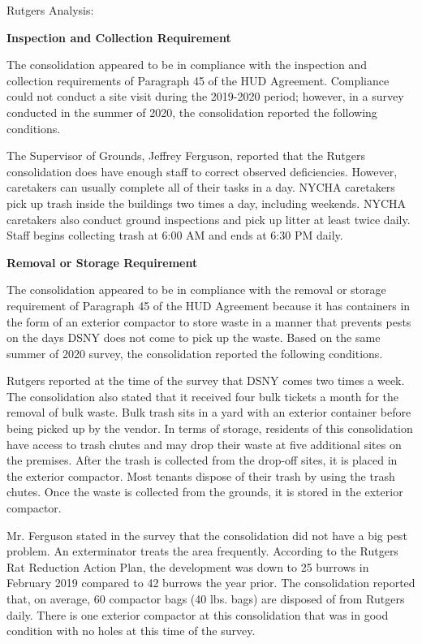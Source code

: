 Rutgers Analysis: 

\textbf{Inspection and Collection Requirement} 

 

The consolidation appeared to be in compliance with the inspection and collection requirements of Paragraph 45 of the HUD Agreement. Compliance could not conduct a site visit during the 2019-2020 period; however, in a survey conducted in the summer of 2020, the consolidation reported the following conditions.

The Supervisor of Grounds, Jeffrey Ferguson, reported that the Rutgers consolidation does have enough staff to correct observed deficiencies. However, caretakers can usually complete all of their tasks in a day. NYCHA caretakers pick up trash inside the buildings two times a day, including weekends. NYCHA caretakers also conduct ground inspections and pick up litter at least twice daily. Staff begins collecting trash at 6:00 AM and ends at 6:30 PM daily. 

\textbf{Removal or Storage Requirement} 

The consolidation appeared to be in compliance with the removal or storage requirement of Paragraph  45 of the HUD Agreement because it has containers in the form of an exterior compactor to store waste in a manner that prevents pests on the days DSNY does not come to pick up the waste. Based on the same summer of  2020  survey, the consolidation reported the following conditions.

Rutgers reported at the time of the survey that DSNY comes two times a week. The consolidation also stated that it received four bulk tickets a month for the removal of bulk waste.  Bulk trash sits in a yard with an exterior container before being picked up by the vendor.  In terms of storage, residents of this consolidation have access to trash chutes and may drop their waste at five additional sites on the premises. After the trash is collected from the drop-off sites, it is placed in the exterior compactor. Most tenants dispose of their trash by using the trash chutes. Once the waste is collected from the grounds, it is stored in the exterior compactor.  

 

Mr. Ferguson stated in the survey that the consolidation did not have a big pest problem. An exterminator treats the area frequently. According to the Rutgers Rat Reduction Action Plan, the development was down to 25 burrows in February 2019 compared to 42 burrows the year prior. The consolidation reported that, on average, 60 compactor bags (40 lbs. bags)  are disposed of from Rutgers daily. There is one exterior compactor at this consolidation that was in good condition with no holes at this time of the survey.

